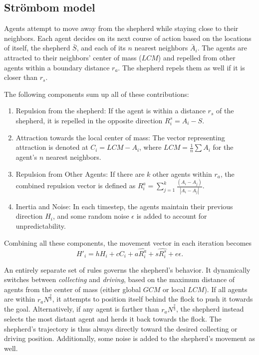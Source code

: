 \documentclass[9pt]{pnas-new}
\begin{document}
\subsection{Str\"{o}mbom model}
Agents attempt to move away from the shepherd while staying close to their neighbors. Each agent decides on its next course of action based on the locations of itself, the shepherd $\bar{S}$, and each of its $n$ nearest neighbors $\bar{A}_{i}$. The agents are attracted to their neighbors' center of mass ($LCM$) and repelled from other agents within a boundary distance $r_a$. The shepherd repels them as well if it is closer than $r_s$.

The following components sum up all of these contributions:
\begin{enumerate}
    \item Repulsion from the shepherd:
    If the agent is within a distance $r_s$ of the shepherd, it is repelled in the opposite direction $R^s_i = A_i - S$.
    
    \item Attraction towards the local center of mass:
    The vector representing attraction is denoted at $C_i = LCM - A_i$, where $LCM = \frac{1}{n}\sum A_i$ for the agent's $n$ nearest neighbors.
    
    \item Repulsion from Other Agents:
    If there are $k$ other agents within $r_a$, the combined repulsion vector is defined as $R^a_i = \sum^k_{j=1} \frac{(A_i - A_j)}{|A_i - A_j|}$.
    
    \item Inertia and Noise:
    In each timestep, the agents maintain their previous direction $H_i$, and some random noise $\epsilon$ is added to account for unpredictability.
\end{enumerate}
Combining all these components, the movement vector in each iteration becomes $$H'_i = h H_i + c C_i + a \hat{R_i^a} + s \hat{R_i^s} + e \epsilon.$$

An entirely separate set of rules governs the shepherd's behavior. It dynamically switches between \textit{collecting} and \textit{driving}, based on the maximum distance of agents from the center of mass (either global $GCM$ or local $LCM$). If all agents are within $r_aN^\frac{2}{3}$, it attempts to position itself behind the flock to push it towards the goal. Alternatively, if any agent is farther than $r_aN^{\frac{2}{3}}$, the shepherd instead selects the most distant agent and herds it back towards the flock. The shepherd's trajectory is thus always directly toward the desired collecting or driving position. Additionally, some noise is added to the shepherd's movement as well.
\end{document}
